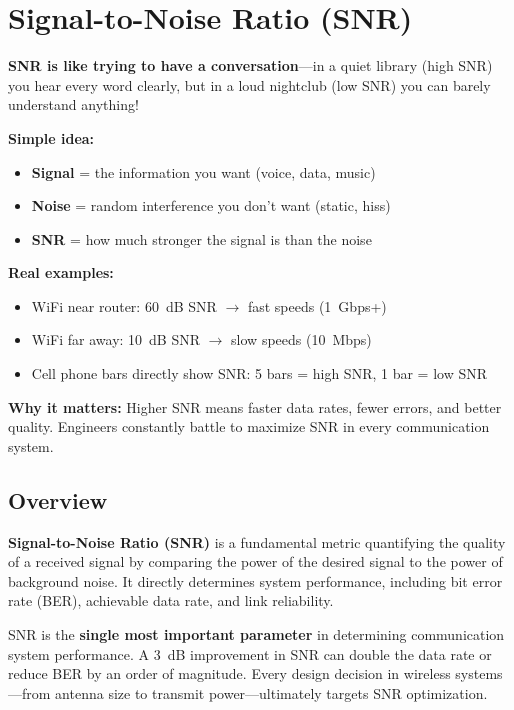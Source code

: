 \chapter{Signal-to-Noise Ratio (SNR)}
\label{ch:snr}

\begin{nontechnical}
\textbf{SNR is like trying to have a conversation}---in a quiet library (high SNR) you hear every word clearly, but in a loud nightclub (low SNR) you can barely understand anything!

\textbf{Simple idea:}
\begin{itemize}
\item \textbf{Signal} = the information you want (voice, data, music)
\item \textbf{Noise} = random interference you don't want (static, hiss)
\item \textbf{SNR} = how much stronger the signal is than the noise
\end{itemize}

\textbf{Real examples:}
\begin{itemize}
\item WiFi near router: 60~dB SNR $\rightarrow$ fast speeds (1~Gbps+)
\item WiFi far away: 10~dB SNR $\rightarrow$ slow speeds (10~Mbps)
\item Cell phone bars directly show SNR: 5 bars = high SNR, 1 bar = low SNR
\end{itemize}

\textbf{Why it matters:} Higher SNR means faster data rates, fewer errors, and better quality. Engineers constantly battle to maximize SNR in every communication system.
\end{nontechnical}

\section{Overview}

\textbf{Signal-to-Noise Ratio (SNR)} is a fundamental metric quantifying the quality of a received signal by comparing the power of the desired signal to the power of background noise. It directly determines system performance, including bit error rate (BER), achievable data rate, and link reliability.

\begin{keyconcept}
SNR is the \textbf{single most important parameter} in determining communication system performance. A 3~dB improvement in SNR can double the data rate or reduce BER by an order of magnitude. Every design decision in wireless systems---from antenna size to transmit power---ultimately targets SNR optimization.
\end{keyconcept}

